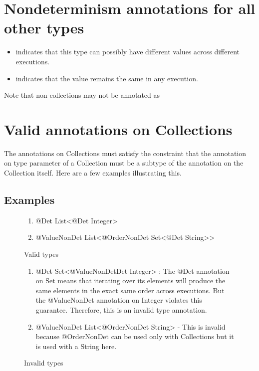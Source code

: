 \section{Nondeterminism annotations for all other types\label{nondeterminism-annotations-elements}}

\begin{itemize}
\item
   indicates
  that this type can possibly have different values across different executions. 
 \item
   indicates that
  the value remains the same in any execution.
\end{itemize}

Note that non-collections may not be annotated as 

\section{Valid annotations on Collections\label{type-validity}}
The annotations on Collections must satisfy the constraint that the annotation on type parameter of a Collection must be a
subtype of the annotation on the Collection itself. Here are a few examples illustrating this.

\subsection{Examples\label{validity-examples}}
\begin{figure}[h]\caption{Valid types}
	\begin{enumerate}
		\item @Det List<@Det Integer> 
		\item @ValueNonDet List<@OrderNonDet Set<@Det String>> 
	\end{enumerate}
\end{figure}

\begin{figure}[h]\caption{Invalid types}
	\begin{enumerate}
		\item @Det Set<@ValueNonDetDet Integer> : The @Det annotation on Set means that iterating over its elements will produce the same elements in the exact same order across executions. But the @ValueNonDet annotation on Integer violates this guarantee. Therefore, this is an invalid type annotation.
		\item @ValueNonDet List<@OrderNonDet String> - This is invalid because @OrderNonDet can be used only with Collections but it is used with a String here.
	\end{enumerate}
\end{figure}

